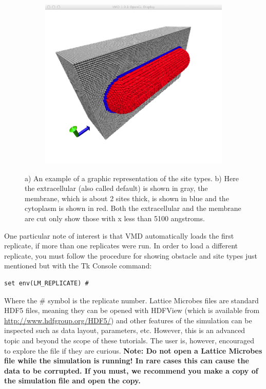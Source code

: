 \begin{figure}[h!]
\begin{subfigure}[b]{0.3\textwidth}
        \end{subfigure}
        \begin{subfigure}[b]{0.69\textwidth}
          \includegraphics[width=\textwidth]{Figures/Sites.png}
        \end{subfigure}
        \caption{a) An example of a graphic representation of the site types. b)  Here the extracellular (also called default) is shown in gray, the membrane, which is about 2 sites thick, is shown in blue and the cytoplasm is shown in red.  Both the extracellular and the membrane are cut only show those with x less than 5100 angstroms.} \label{fig:repSites}
\end{figure}

One particular note of interest is that VMD automatically loads the first replicate, if more than one replicates were run.  In order to load a different replicate, you must follow the procedure for showing obstacle and site types just mentioned but with the Tk Console command:

\begin{verbatim}
set env(LM_REPLICATE) #
\end{verbatim}

Where the \# symbol is the replicate number.  Lattice Microbes files are standard HDF5 files, meaning they can be opened with HDFView (which is available from \url{http://www.hdfgroup.org/HDF5/}) and other features of the simulation can be inspected such as data layout, parameters, etc.  However, this is an advanced topic and beyond the scope of these tutorials. The user is, however, encouraged to explore the file if they are curious.  \textbf{Note: Do not open a Lattice Microbes file while the simulation is running!  In rare cases this can cause the data to be corrupted. If you must, we recommend you make a copy of the simulation file and open the copy.} \\

